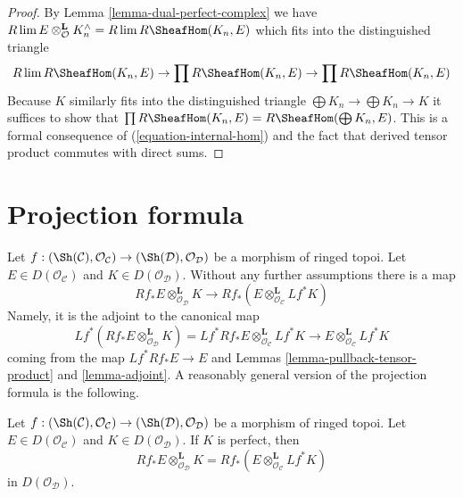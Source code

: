\begin{proof}
By Lemma \ref{lemma-dual-perfect-complex} we have
$R\lim E \otimes^\mathbf{L}_\mathcal{O} K_n^\wedge =
R\lim R\SheafHom(K_n, E)$
which fits into the distinguished triangle
$$
R\lim R\SheafHom(K_n, E) \to
\prod R\SheafHom(K_n, E) \to
\prod R\SheafHom(K_n, E)
$$
Because $K$ similarly fits into the distinguished triangle
$\bigoplus K_n \to \bigoplus K_n \to K$ it suffices to show that
$\prod R\SheafHom(K_n, E) = R\SheafHom(\bigoplus K_n, E)$.
This is a formal consequence of (\ref{equation-internal-hom})
and the fact that derived tensor product commutes with direct sums.
\end{proof}




\section{Projection formula}
\label{section-projection-formula}

\noindent
Let $f : (\Sh(\mathcal{C}), \mathcal{O}_\mathcal{C}) \to
(\Sh(\mathcal{D}), \mathcal{O}_\mathcal{D})$ be a morphism of ringed topoi.
Let $E \in D(\mathcal{O}_\mathcal{C})$ and $K \in D(\mathcal{O}_\mathcal{D})$.
Without any further assumptions there is a map
\begin{equation}
\label{equation-projection-formula-map}
Rf_*E \otimes^\mathbf{L}_{\mathcal{O}_\mathcal{D}} K
\longrightarrow
Rf_*(E \otimes^\mathbf{L}_{\mathcal{O}_\mathcal{C}} Lf^*K)
\end{equation}
Namely, it is the adjoint to the canonical map
$$
Lf^*(Rf_*E \otimes^\mathbf{L}_{\mathcal{O}_\mathcal{D}} K) =
Lf^*Rf_*E \otimes^\mathbf{L}_{\mathcal{O}_\mathcal{C}} Lf^*K
\longrightarrow
E \otimes^\mathbf{L}_{\mathcal{O}_\mathcal{C}} Lf^*K
$$
coming from the map $Lf^*Rf_*E \to E$ and Lemmas
\ref{lemma-pullback-tensor-product} and \ref{lemma-adjoint}.
A reasonably general version of the projection formula is the following.

\begin{lemma}
\label{lemma-projection-formula}
Let $f : (\Sh(\mathcal{C}), \mathcal{O}_\mathcal{C}) \to
(\Sh(\mathcal{D}), \mathcal{O}_\mathcal{D})$ be a morphism of ringed topoi.
Let $E \in D(\mathcal{O}_\mathcal{C})$ and $K \in D(\mathcal{O}_\mathcal{D})$.
If $K$ is perfect, then
$$
Rf_*E \otimes^\mathbf{L}_{\mathcal{O}_\mathcal{D}} K =
Rf_*(E \otimes^\mathbf{L}_{\mathcal{O}_\mathcal{C}} Lf^*K)
$$
in $D(\mathcal{O}_\mathcal{D})$.
\end{lemma}

